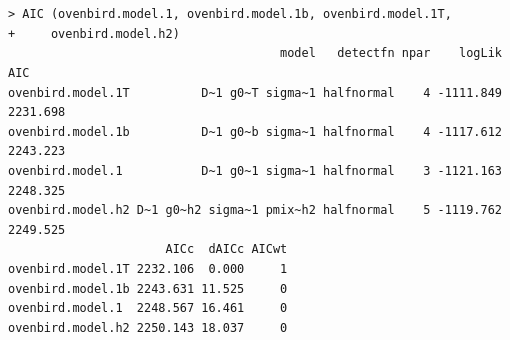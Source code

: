 \begin{verbatim}


> AIC (ovenbird.model.1, ovenbird.model.1b, ovenbird.model.1T,
+     ovenbird.model.h2)
                                      model   detectfn npar    logLik      AIC
ovenbird.model.1T          D~1 g0~T sigma~1 halfnormal    4 -1111.849 2231.698
ovenbird.model.1b          D~1 g0~b sigma~1 halfnormal    4 -1117.612 2243.223
ovenbird.model.1           D~1 g0~1 sigma~1 halfnormal    3 -1121.163 2248.325
ovenbird.model.h2 D~1 g0~h2 sigma~1 pmix~h2 halfnormal    5 -1119.762 2249.525
                      AICc  dAICc AICwt
ovenbird.model.1T 2232.106  0.000     1
ovenbird.model.1b 2243.631 11.525     0
ovenbird.model.1  2248.567 16.461     0
ovenbird.model.h2 2250.143 18.037     0

\end{verbatim}







